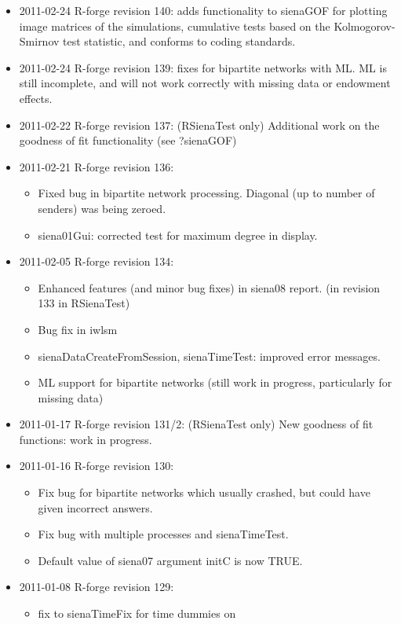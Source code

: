 \documentclass[a4paper,fleqn,11pt]{article}
\newcommand{\+}{\, + \,}
\begin{document}
{\begin{small}
\begin{itemize}
\item 2011-02-24 R-forge revision 140: adds functionality to sienaGOF
  for plotting
  image matrices of the simulations, cumulative tests based on the Kolmogorov-
  Smirnov test statistic, and conforms to coding standards.
\item 2011-02-24 R-forge revision 139: fixes for bipartite networks with
  ML. ML is still incomplete, and will not work correctly with missing data or
  endowment effects.
\item 2011-02-22 R-forge revision 137: (RSienaTest only)
Additional work on the goodness of fit functionality (see ?sienaGOF)
\item 2011-02-21 R-forge revision 136:
\begin{itemize}
\item Fixed bug in bipartite network processing. Diagonal (up to number of
  senders) was being zeroed.
\item siena01Gui: corrected test for maximum degree in display.
\end{itemize}
\item 2011-02-05 R-forge revision 134:
\begin{itemize}
\item Enhanced features (and minor bug fixes) in siena08 report. (in revision
  133 in RSienaTest)
\item Bug fix in iwlsm
\item sienaDataCreateFromSession, sienaTimeTest: improved error messages.
\item ML support for bipartite networks (still work in progress,
  particularly for missing data)
\end{itemize}
\item 2011-01-17 R-forge revision 131/2: (RSienaTest only)
New goodness of fit functions: work in progress.
\item 2011-01-16 R-forge revision 130:
\begin{itemize}
\item Fix bug for bipartite networks which usually crashed, but could have given
  incorrect answers.
\item Fix bug with multiple processes and sienaTimeTest.
\item Default value of siena07 argument initC is now TRUE.
\end{itemize}
\item 2011-01-08  R-forge revision 129:
\begin{itemize}
\item fix to sienaTimeFix for time dummies on

\end{itemize}
\end{itemize}
\end{small}}
\end{document}
